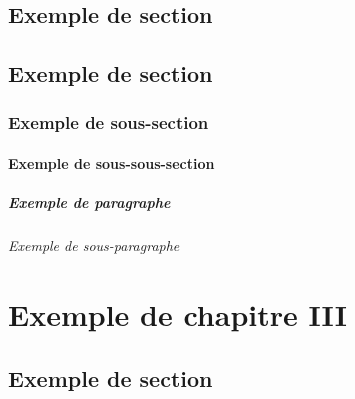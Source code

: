 \documentclass[precis,vgrid]{frenchlaw}
\begin{document}
 \lipsum[4]

 \lipsum[5]

 \lipsum[6]

\section{Exemple de section}

\section{Exemple de section}

\subsection{Exemple de sous-section}

\subsubsection{Exemple de sous-sous-section}

\paragraph{Exemple de paragraphe}

\subparagraph{Exemple de sous-paragraphe}

\chapter{Exemple de chapitre III}

\section{Exemple de section}
\end{document}
